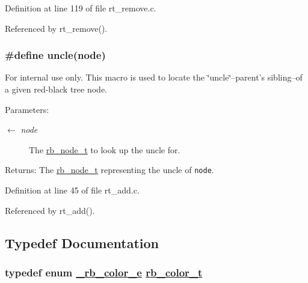 Definition at line 119 of file rt\_\-remove.c.

Referenced by rt\_\-remove().\hypertarget{group__dbprim__rbtree_ga43}{
\subsubsection[uncle]{\setlength{\rightskip}{0pt plus 5cm}\#define uncle(node)}}
\label{group__dbprim__rbtree_ga43}


\begin{Desc}
\item[For internal use only.]
This macro is used to locate the \char`\"{}uncle\char`\"{}--parent's sibling--of a given red-black tree node.

\begin{Desc}
\item[Parameters:]
\begin{description}
\item[\mbox{$\leftarrow$} {\em node}]The \hyperlink{group__dbprim__rbtree_ga1}{rb\_\-node\_\-t} to look up the uncle for.\end{description}
\end{Desc}
\begin{Desc}
\item[Returns:]The \hyperlink{group__dbprim__rbtree_ga1}{rb\_\-node\_\-t} representing the uncle of {\tt node}.\end{Desc}
\end{Desc}


Definition at line 45 of file rt\_\-add.c.

Referenced by rt\_\-add().

\subsection{Typedef Documentation}
\hypertarget{group__dbprim__rbtree_ga4}{
\subsubsection[rb\_\-color\_\-t]{\setlength{\rightskip}{0pt plus 5cm}typedef enum \hyperlink{group__dbprim__rbtree_ga52}{\_\-rb\_\-color\_\-e} \hyperlink{group__dbprim__rbtree_ga4}{rb\_\-color\_\-t}}}
\label{group__dbprim__rbtree_ga4}


